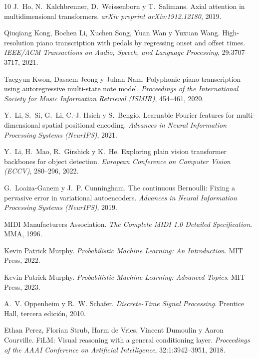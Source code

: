 \documentclass[11pt,spanish,listoffigures,listoftables]{tfgetsinf}
\begin{document}
\begin{thebibliography}{10}
J.~Ho, N.~Kalchbrenner, D.~Weissenborn y T.~Salimans.
\newblock Axial attention in multidimensional transformers.
\newblock \textit{arXiv preprint arXiv:1912.12180}, 2019.

Qiuqiang Kong, Bochen Li, Xuchen Song, Yuan Wan y Yuxuan Wang.
\newblock High-resolution piano transcription with pedals by regressing onset and offset times.
\newblock \textit{IEEE/ACM Transactions on Audio, Speech, and Language Processing}, 29:3707--3717, 2021.

Taegyun Kwon, Dasaem Jeong y Juhan Nam.
\newblock Polyphonic piano transcription using autoregressive multi-state note model.
\newblock \textit{Proceedings of the International Society for Music Information Retrieval (ISMIR)}, 454--461, 2020.

Y.~Li, S.~Si, G.~Li, C.-J. Hsieh y S.~Bengio.
\newblock Learnable {Fourier} features for multi-dimensional spatial positional encoding.
\newblock \textit{Advances in Neural Information Processing Systems (NeurIPS)}, 2021.

Y.~Li, H.~Mao, R.~Girshick y K.~He.
\newblock Exploring plain vision transformer backbones for object detection.
\newblock \textit{European Conference on Computer Vision (ECCV)}, 280--296, 2022.

G.~Loaiza-Ganem y J.~P. Cunningham.
\newblock The continuous {Bernoulli}: Fixing a pervasive error in variational autoencoders.
\newblock \textit{Advances in Neural Information Processing Systems (NeurIPS)}, 2019.

{MIDI Manufacturers Association}.
\newblock \textit{The Complete {MIDI} 1.0 Detailed Specification}.
\newblock MMA, 1996.

Kevin Patrick Murphy.
\newblock \textit{Probabilistic Machine Learning: An Introduction}.
\newblock MIT Press, 2022.


Kevin Patrick Murphy.
\newblock \textit{Probabilistic Machine Learning: Advanced Topics}.
\newblock MIT Press, 2023.


A.~V. Oppenheim y R.~W. Schafer.
\newblock \textit{Discrete-Time Signal Processing}.
\newblock Prentice Hall, tercera edición, 2010.

Ethan Perez, Florian Strub, Harm de Vries, Vincent Dumoulin y Aaron Courville.
\newblock FiLM: Visual reasoning with a general conditioning layer.
\newblock \textit{Proceedings of the AAAI Conference on Artificial Intelligence}, 32:1:3942--3951, 2018.



\end{thebibliography}
\end{document}
